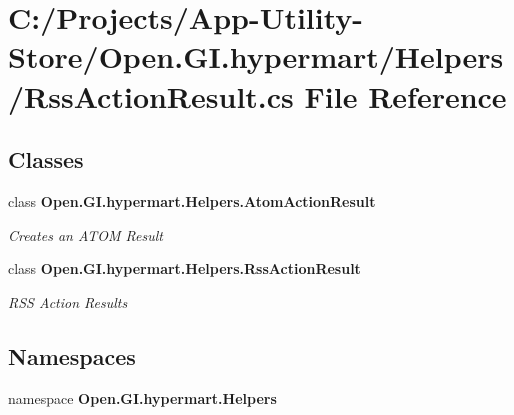 \section{C\+:/\+Projects/\+App-\/\+Utility-\/\+Store/\+Open.G\+I.\+hypermart/\+Helpers/\+Rss\+Action\+Result.cs File Reference}
\label{_rss_action_result_8cs}
\subsection*{Classes}
\begin{DoxyCompactItemize}
\item 
class \textbf{ Open.\+G\+I.\+hypermart.\+Helpers.\+Atom\+Action\+Result}
\begin{DoxyCompactList}\small\item\em Creates an A\+T\+OM Result \end{DoxyCompactList}\item 
class \textbf{ Open.\+G\+I.\+hypermart.\+Helpers.\+Rss\+Action\+Result}
\begin{DoxyCompactList}\small\item\em R\+SS Action Results \end{DoxyCompactList}\end{DoxyCompactItemize}
\subsection*{Namespaces}
\begin{DoxyCompactItemize}
\item 
namespace \textbf{ Open.\+G\+I.\+hypermart.\+Helpers}
\end{DoxyCompactItemize}

